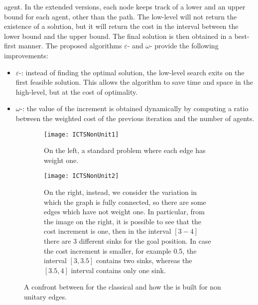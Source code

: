 agent. In the extended versions, each node keeps track of a lower and an upper
bound for each agent, other than the path. The low-level will not return the
existence of a solution, but it will return the cost in the interval between
the lower bound and the upper bound. The final solution is then obtained in a
best-first manner. \newline
The proposed algorithms $\varepsilon$- and $\omega$-
provide the following improvements:
\begin{itemize}
  \item $\varepsilon$-: instead of finding the optimal solution, the
    low-level search exits on the first feasible solution. This allows the
    algorithm to save time and space in the high-level, but at the cost of 
    optimality.
  \item $\omega$-: the value of the increment is obtained
    dynamically by computing a ratio between the weighted cost of the previous
    iteration and the number of agents.
\end{itemize}
\begin{figure}[htpb]
  \centering
  \begin{subfigure}[t]{0.49\linewidth}
    \centering
    \texttt{[image: ICTSNonUnit1]}
    \caption{On the left, a standard  problem where each edge has
      weight one.} 
  \end{subfigure}
  \hfill
  \begin{subfigure}[t]{0.49\linewidth}
    \centering
    \texttt{[image: ICTSNonUnit2]}
    \caption{On the right, instead, we consider the variation in which the
      graph is fully connected, so there are some edges which have not weight 
      one. In particular, from the image on the right, it is possible to see 
      that the cost increment is one, then in the interval $[3-4]$ there are 3 
      different sinks for the goal position. In case the cost increment is 
      smaller, for example 0.5, the interval $[3,3.5]$ contains two sinks, 
      whereas the $[3.5,4]$ interval contains only one sink.}
  \end{subfigure}
  \caption{A confront between  for the classical  and how
  the  is built for non unitary edges.}
  \label{fig:eICTS}
\end{figure}
